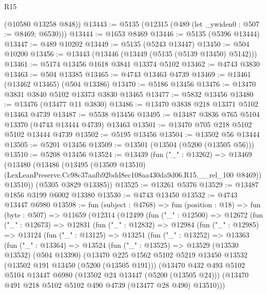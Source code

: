 \begin{lexlean}{R15}
\begin{coremodule}
{{{{{{{{{{{      (@10580 @13258 @848))
@13443 := @5135 (@12315 (@489 (let _ywiden0 : @507 := @8469; @6530)))
@13444 := @1653 @8469
@13446 := @5135 (@5396 @13444)
@13447 := @489 @10202
@13449 := @5135 (@5243 @13447)
@13450 := @504 @10200
@13456 := @13443 (@13446 (@13449 (@5135 (@5139 @13450) @5142)))
@13461 := @5174 @13456 @1618 @3841 @13374 @5102
@13462 := @4743 @3830
@13463 := @504 @13385
@13465 := @4743 @13463 @4739
@13469 := @13461 (@13462 @13465) (@504 @13386)
@13470 := @5186 @13456
@13476 := @13470 @3831 @3840 @5102 @13373 @3830 @13465
@13477 := @5832 @13456
@13480 := @13476 (@13477 @11 @3830)
@13486 := @13470 @3838 @218 @13371 @5102 @13463 @4739
@13487 := @5538 @13456
@13495 := @13487 @3836 @765 @5104 @13370 (@4743 @13444 @4739) @13463
@13501 := @13470 @705 @218 @5102 @5102 @13444 @4739
@13502 := @5195 @13456
@13504 := @13502 @56 @13444
@13505 := @5201 @13456
@13509 := @13501 (@13504 (@5200 (@13505 @56)))
@13510 := @5208 @13456
@13524 := @13439
    (fun ("_" : @13262) =>
    @13469
      (@13480
        (@13486
          (@13495
            (@13509 @13510)
            (LexLeanPreserve.Cc98c37aafb92bdd8ec108aa430da9d06.R15.__rel_100 @8469))
          @13510))
      (@5305 @3829 @13385))
@13525 := @13261 @5376
@13529 := @13487 @1856 @3199 @6002 @13380
@13530 := @4743 @13450
@13532 := @4743 @13447 @6980
@13598 := fun (subject : @4768) =>
  fun (position : @18) =>
  fun (byte : @507) =>
  @11659
    (@12314
      (@12499
        (fun ("_" : @12500) =>
        @12672
          (fun ("_" : @12673) =>
          @12831
            (fun ("_" : @12832) =>
            @12984
              (fun ("_" : @12985) =>
              @13124
                (fun ("_" : @13125) =>
                @13251
                  (fun ("_" : @13252) =>
                  @13363
                    (fun ("_" : @13364) =>
                    @13524
                      (fun ("_" : @13525) =>
                      @13529
                        (@13530 @13532)
                        (@504 @13390)
                        (@13470
                          @225
                          @1562
                          @5102
                          @5219
                          @13450
                          @13532
                          (@13502 @191 @13450 (@5200 (@13505 @191)))
                          (@13470
                            @432
                            @493
                            @5102
                            @5104
                            @13447
                            @6980
                            (@13502 @24 @13447 (@5200 (@13505 @24)))
                            (@13470 @491 @218 @5102 @5102 @490 @4739 (@13477 @28 @490) @13510)))
}}}}}}}}}}}
\end{coremodule}
\end{lexlean}
